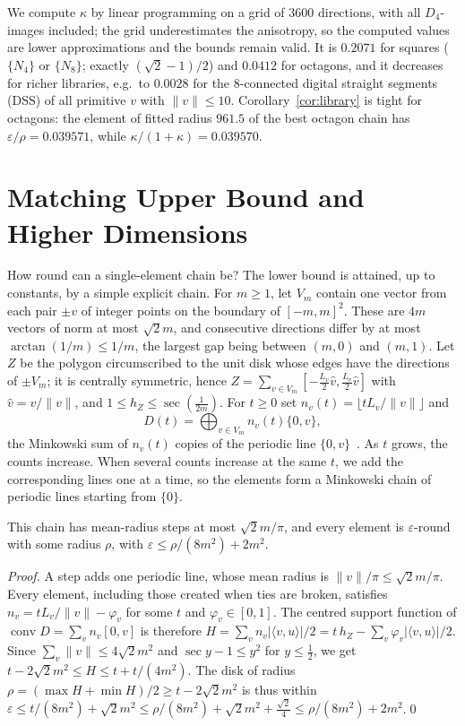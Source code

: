 \documentclass[runningheads]{llncs}
\newcommand{\conv}{\operatorname{conv}}
\begin{document}
We compute $\kappa$ by linear programming on a grid of 3600 directions, with all $D_4$-images included; the grid underestimates the anisotropy, so the computed values are lower approximations and the bounds remain valid. It is $0.2071$ for squares ($\{N_4\}$ or $\{N_8\}$; exactly $(\sqrt2-1)/2$) and $0.0412$ for octagons, and it decreases for richer libraries, e.g.\ to $0.0028$ for the 8-connected digital straight segments (DSS) of all primitive $v$ with $\|v\|\le10$. Corollary~\ref{cor:library} is tight for octagons: the element of fitted radius $961.5$ of the best octagon chain has $\varepsilon/\rho=0.039571$, while $\kappa/(1+\kappa)=0.039570$.

\section{Matching Upper Bound and Higher Dimensions}\label{sec:upper}
How round can a single-element chain be? The lower bound is attained, up to constants, by a simple explicit chain. For $m\ge1$, let $V_m$ contain one vector from each pair $\pm v$ of integer points on the boundary of $[-m,m]^2$. These are $4m$ vectors of norm at most $\sqrt2m$, and consecutive directions differ by at most $\arctan(1/m)\le1/m$, the largest gap being between $(m,0)$ and $(m,1)$. Let $Z$ be the polygon circumscribed to the unit disk whose edges have the directions of $\pm V_m$; it is centrally symmetric, hence $Z=\sum_{v\in V_m}[-\frac{L_v}2\hat v,\frac{L_v}2\hat v]$ with $\hat v=v/\|v\|$, and $1\le h_Z\le\sec(\frac1{2m})$. For $t\ge0$ set $n_v(t)=\lfloor tL_v/\|v\|\rfloor$ and
\[
D(t)=\bigoplus_{v\in V_m}n_v(t)\{0,v\},
\]
the Minkowski sum of $n_v(t)$ copies of the periodic line $\{0,v\}$~\cite{jones1996}. As $t$ grows, the counts increase. When several counts increase at the same $t$, we add the corresponding lines one at a time, so the elements form a Minkowski chain of periodic lines starting from $\{0\}$.

\begin{theorem}\label{thm:upper}
This chain has mean-radius steps at most $\sqrt2m/\pi$, and every element is $\varepsilon$-round with some radius $\rho$, with $\varepsilon\le\rho/(8m^2)+2m^2$.
\end{theorem}
\begin{proof}
A step adds one periodic line, whose mean radius is $\|v\|/\pi\le\sqrt2m/\pi$. Every element, including those created when ties are broken, satisfies $n_v=tL_v/\|v\|-\varphi_v$ for some $t$ and $\varphi_v\in[0,1]$. The centred support function of $\conv D=\sum_vn_v[0,v]$ is therefore $H=\sum_vn_v|\langle v,u\rangle|/2=t\,h_Z-\sum_v\varphi_v|\langle v,u\rangle|/2$. Since $\sum_v\|v\|\le4\sqrt2m^2$ and $\sec y-1\le y^2$ for $y\le\frac12$, we get $t-2\sqrt2m^2\le H\le t+t/(4m^2)$. The disk of radius $\rho=(\max H+\min H)/2\ge t-2\sqrt2m^2$ is thus within $\varepsilon\le t/(8m^2)+\sqrt2m^2\le\rho/(8m^2)+\sqrt2m^2+\frac{\sqrt2}4\le\rho/(8m^2)+2m^2$.\qed
\end{proof}
\end{document}
